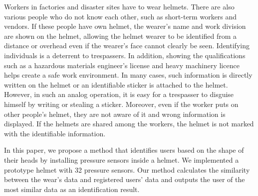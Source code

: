 \documentclass[sigchi,authordraft]{acmart}
\begin{document}
Workers in factories and disaster sites have to wear helmets. There are also various people who do not know each other, such as short-term workers and vendors. If these people have own helmet, the wearer's name and work division are shown on the helmet, allowing the helmet wearer to be identified from a distance or overhead even if the wearer's face cannot clearly be seen. Identifying individuals is a deterrent to trespassers. In addition, showing the qualifications such as a hazardous materials engineer's license and heavy machinery licence helps create a safe work environment. In many cases, such information is directly written on the helmet or an identifiable sticker is attached to the helmet. However, in such an analog operation, it is easy for a trespasser to disguise himself by writing or stealing a sticker. Moreover, even if the worker puts on other people's helmet, they are not aware of it and wrong information is displayed. If the helmets are shared among the workers, the helmet is not marked with the identifiable information.\par


In this paper, we propose a method that identifies users based on the shape of their heads by installing pressure sensors inside a helmet. We implemented a prototype helmet with 32 pressure sensors. Our method calculates the similarity between the wear's data and registered users' data and outputs the user of the most similar data as an identification result.\par
\end{document}
